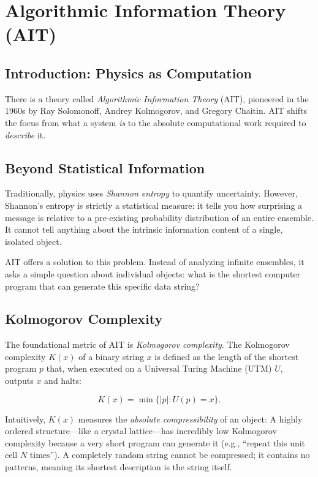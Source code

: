 \chapter{Algorithmic Information Theory (AIT)}
\label{chap:ait}

\section{Introduction: Physics as Computation}

There is a theory called \emph{Algorithmic Information Theory} (AIT), pioneered in the 1960s by Ray Solomonoff, Andrey Kolmogorov, and Gregory Chaitin.
AIT shifts the focus from what a system \emph{is} to the absolute computational work required to \emph{describe} it. 

\section{Beyond Statistical Information}

Traditionally, physics uses \emph{Shannon entropy} to quantify uncertainty.
However, Shannon's entropy is strictly a statistical measure: it tells you how surprising a message is relative to a pre-existing probability distribution of an entire ensemble.
It cannot tell anything about the intrinsic information content of a single, isolated object.

AIT offers a solution to this problem. Instead of analyzing infinite ensembles, it asks a simple question about individual objects: what is the shortest computer 
program that can generate this specific data string?


\section{Kolmogorov Complexity}

The foundational metric of AIT is \emph{Kolmogorov complexity}.
The Kolmogorov complexity $K(x)$ of a binary string $x$ is defined as the length of the shortest program $p$ that, when executed on a Universal Turing Machine (UTM) $U$, outputs $x$ and halts:

\[
K(x) = \min \{ |p| : U(p) = x \}.
\]

Intuitively, $K(x)$ measures the \emph{absolute compressibility} of an object:
A highly ordered structure—like a crystal lattice—has incredibly low Kolmogorov complexity because a very short program can generate it (e.g., ``repeat this unit cell $N$ times'').
A completely random string cannot be compressed; it contains no patterns, meaning its shortest description is the string itself. 



